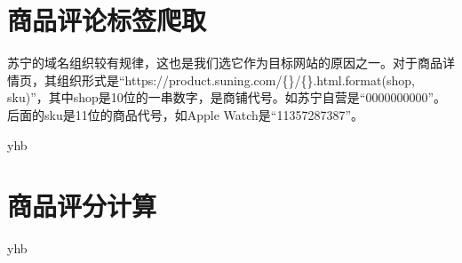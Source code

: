 \section{商品评论标签爬取}

苏宁的域名组织较有规律，这也是我们选它作为目标网站的原因之一。对于商品详情页，其组织形式是“https://product.suning.com/\{\}/\{\}.html.format(shop, sku)”，其中shop是10位的一串数字，是商铺代号。如苏宁自营是“0000000000”。后面的sku是11位的商品代号，如Apple Watch是“11357287387”。


















yhb
\section{商品评分计算}
yhb









